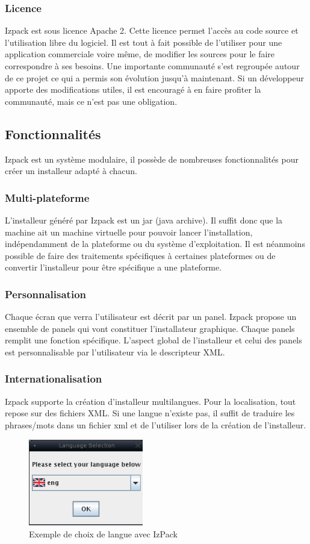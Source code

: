 \subsubsection{Licence}
Izpack est sous licence Apache 2. Cette licence permet l'accès au code source et l'utilisation libre du logiciel.
Il est tout à fait possible de l'utiliser pour une application commerciale voire même, de modifier les sources pour le faire correspondre à ses besoins.
Une importante communauté s'est regroupée autour de ce projet ce qui a permis son évolution jusqu'à maintenant.
Si un développeur apporte des modifications utiles, il est encouragé à en faire profiter la communauté, mais ce n'est pas une obligation.
\subsection{Fonctionnalités}
Izpack est un système modulaire, il possède de nombreuses fonctionnalités pour créer un installeur adapté à chacun.
\subsubsection{Multi-plateforme}
L'installeur généré par Izpack est un jar (java archive).
Il suffit donc que la machine ait un machine virtuelle pour pouvoir lancer l'installation, indépendamment de la plateforme ou du système d'exploitation.
Il est néanmoins possible de faire des traitements spécifiques à certaines plateformes ou de convertir l'installeur pour être spécifique a une plateforme.
\subsubsection{Personnalisation}
Chaque écran que verra l'utilisateur est décrit par un panel.
Izpack propose un ensemble de panels qui vont constituer l'installateur graphique.
Chaque panels remplit une fonction spécifique. L'aspect global de l'installeur et celui des panels est personnalisable par l'utilisateur via le descripteur XML.
\subsubsection{Internationalisation}
Izpack supporte la création d'installeur multilangues. Pour la localisation, tout repose sur des fichiers XML.
Si une langue n'existe pas, il suffit de traduire les phrases/mots dans un fichier xml et de l'utiliser lors de la création de l'installeur.
\begin{figure}[H]
	\centering
	\includegraphics[width=5cm]{../image/LangChoice.png}
	\caption{Exemple de choix de langue avec IzPack}
\end{figure}
